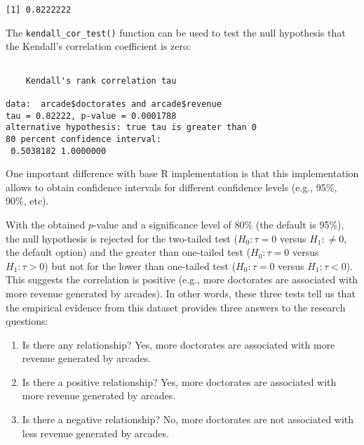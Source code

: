 \documentclass[
  10pt,
  letterpaper,
]{article}
\newenvironment{Shaded}{\begin{snugshade}}{\end{snugshade}}
\newcommand{\AttributeTok}[1]{\textcolor[rgb]{0.40,0.45,0.13}{#1}}
\newcommand{\FloatTok}[1]{\textcolor[rgb]{0.68,0.00,0.00}{#1}}
\newcommand{\FunctionTok}[1]{\textcolor[rgb]{0.28,0.35,0.67}{#1}}
\newcommand{\NormalTok}[1]{\textcolor[rgb]{0.00,0.23,0.31}{#1}}
\newcommand{\SpecialCharTok}[1]{\textcolor[rgb]{0.37,0.37,0.37}{#1}}
\newcommand{\StringTok}[1]{\textcolor[rgb]{0.13,0.47,0.30}{#1}}
\providecommand{\tightlist}{%
  \setlength{\itemsep}{0pt}\setlength{\parskip}{0pt}}\usepackage{longtable,booktabs,array}
\begin{document}
\begin{verbatim}
[1] 0.8222222
\end{verbatim}

The \texttt{kendall\_cor\_test()} function can be used to test the null
hypothesis that the Kendall's correlation coefficient is zero:

\begin{Shaded}
\end{Shaded}

\begin{verbatim}

    Kendall's rank correlation tau

data:  arcade$doctorates and arcade$revenue
tau = 0.82222, p-value = 0.0001788
alternative hypothesis: true tau is greater than 0
80 percent confidence interval:
 0.5038182 1.0000000
\end{verbatim}

One important difference with base R implementation is that this
implementation allows to obtain confidence intervals for different
confidence levels (e.g., 95\%, 90\%, etc).

With the obtained \(p\)-value and a significance level of 80\% (the
default is 95\%), the null hypothesis is rejected for the two-tailed
test (\(H_0: \tau = 0\) versus \(H_1: \neq 0\), the default option) and
the greater than one-tailed test (\(H_0: \tau = 0\) versus
\(H_1: \tau > 0\)) but not for the lower than one-tailed test
(\(H_0: \tau = 0\) versus \(H_1: \tau < 0\)). This suggests the
correlation is positive (e.g., more doctorates are associated with more
revenue generated by arcades). In other words, these three tests tell us
that the empirical evidence from this dataset provides three answers to
the research questions:

\begin{enumerate}
\def\labelenumi{\arabic{enumi}.}
\tightlist
\item
  Is there any relationship? Yes, more doctorates are associated with
  more revenue generated by arcades.
\item
  Is there a positive relationship? Yes, more doctorates are associated
  with more revenue generated by arcades.
\item
  Is there a negative relationship? No, more doctorates are not
  associated with less revenue generated by arcades.
\end{enumerate}
\end{document}
